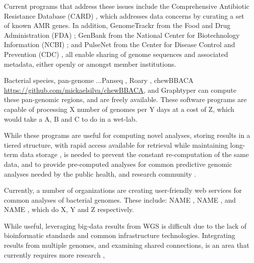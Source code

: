 \documentclass[a4,center,fleqn]{NAR}
\begin{document}
Current programs that address these issues include the Comprehensive Antibiotic Resistance Database (CARD) \cite{mcarthur2013comprehensive}, which addresses data concerns by curating a set of known AMR genes.
In addition, GenomeTrackr from the Food and Drug Administration (FDA) \cite{allard2016practical}; GenBank from the National Center for Biotechnology Information (NCBI) \cite{doi:10.1093/nar/gks1195}; and PulseNet from the Center for Disease Control and Prevention (CDC) \cite{swaminathan2001pulsenet}, all enable sharing of genome sequences and associated metadata, either openly or amongst member institutions.



Bacterial species, pan-genome ...Panseq \cite{laing2010pan}, Roary \cite{page2015roary}, chewBBACA \url{https://github.com/mickaelsilva/chewBBACA}, and Graphtyper \cite{Eggertsson148403} can compute these pan-genomic regions, and are freely available.
These software programs are capable of processing X number of genomes per Y days at a cost of Z, which would take a A, B and C to do in a wet-lab.

While these programs are useful for computing novel analyses, storing results in a tiered structure, with rapid access available for retrieval while maintaining long-term data storage \cite{schatz2015biological}, is needed to prevent the constant re-computation of the same data, and to provide pre-computed analyses for common predictive genomic analyses needed by the public health, and research community \cite{de2015trends}.

Currently, a number of organizations are creating user-friendly web services for common analyses of bacterial genomes.
These include: NAME \cite{joensen2014real,larsen2012multilocus}, NAME \cite{liu2016construction}, and NAME \cite{hasman2015detection}, which do X, Y and Z respectively.

While useful, leveraging big-data results from WGS is difficult due to the lack of bioinformatic standards and common infrastructure technologies.
Integrating results from multiple genomes, and examining shared connections, is an area that currently requires more research \cite{fricke2014bacterial},
\end{document}
